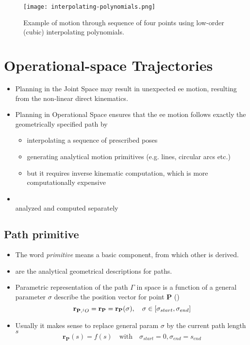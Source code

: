 \begin{figure}[hbt!]
	\centering
	\texttt{[image: interpolating-polynomials.png]}
	\caption{Example of motion through sequence of four points using low-order (cubic) interpolating polynomials.}
	\label{fig:interpolating-polynomials}
\end{figure}

\section{Operational-space Trajectories}
\begin{itemize}
	\item Planning in the Joint Space may result in unexpected \ac{ee} motion, resulting from the non‐linear direct kinematics.
	\item Planning in Operational Space ensures that the \ac{ee} motion follows exactly the geometrically specified path by
	\begin{itemize}
		\item interpolating a sequence of prescribed poses
		\item generating analytical motion primitives (e.g. lines, circular arcs etc.)
		\item but it requires  inverse kinematic computation, which is more computationally expensive
	\end{itemize}
	\item {\color{red}}\\
	analyzed and computed separately
\end{itemize}

\subsection{Path primitive}
\begin{itemize}
	\item The word \textit{primitive} means a basic component, from which other is derived.
	\item {} are the analytical geometrical descriptions for paths.
	\item Parametric representation of the path $\Gamma$ in space is a function of a general parameter $\sigma$ describe the position vector for point $\textbf{P}$ ()
	\[ \textbf{r}_{\textbf{P}, \prescript{j}{}{O}} = \textbf{r}_\textbf{P} = \textbf{r}_\textbf{P}(\sigma), \quad \sigma\in[\sigma_{start}, \sigma_{end}]\]
	\item Usually it makes sense to replace general \ac{param} $\sigma$ by the current path length $s$
	\[ \textbf{r}_\textbf{P}(s) = f(s) \quad\text{with}\quad \sigma_{start}=0, \sigma_{end} = s_{end} \]
\end{itemize}

